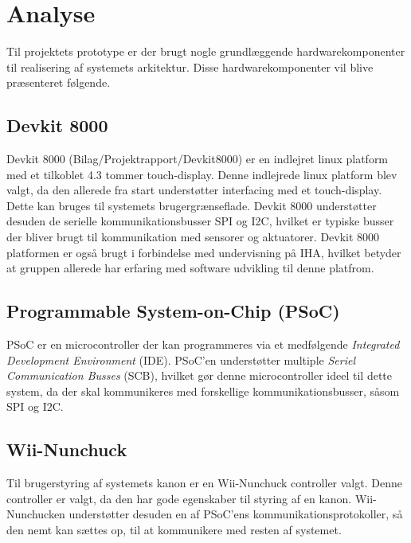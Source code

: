 \chapter{Analyse}
\label{afsnit:analyse}
Til projektets prototype er der brugt nogle grundlæggende hardwarekomponenter til realisering af systemets arkitektur. Disse hardwarekomponenter vil blive præsenteret følgende.

\section{Devkit 8000}
Devkit 8000 (Bilag/Projektrapport/Devkit8000) er en indlejret linux platform med et tilkoblet 4.3 tommer touch-display. Denne indlejrede linux platform blev valgt, da den allerede fra start understøtter interfacing med et touch-display. Dette kan bruges til systemets brugergrænseflade. Devkit 8000 understøtter desuden de serielle kommunikationsbusser SPI og I2C, hvilket er typiske busser der bliver brugt til kommunikation med sensorer og aktuatorer. \newline 
\noindent Devkit 8000 platformen er også brugt i forbindelse med undervisning på IHA, hvilket betyder at gruppen allerede har erfaring med software udvikling til denne platfrom.

\section{Programmable System-on-Chip (PSoC)}
PSoC \cite{psoc} er en microcontroller der kan programmeres via et medfølgende \textit{Integrated Development Environment} (IDE). PSoC'en understøtter multiple \textit{Seriel Communication Busses} (SCB), hvilket gør denne microcontroller ideel til dette system, da der skal kommunikeres med forskellige kommunikationsbusser, såsom SPI og I2C.

\section{Wii-Nunchuck}
Til brugerstyring af systemets kanon er en Wii-Nunchuck controller \cite{nunchuck} valgt. Denne controller er valgt, da den har gode egenskaber til styring af en kanon. Wii-Nunchucken understøtter desuden en af PSoC'ens kommunikationsprotokoller, så den nemt kan sættes op, til at kommunikere med resten af systemet.

